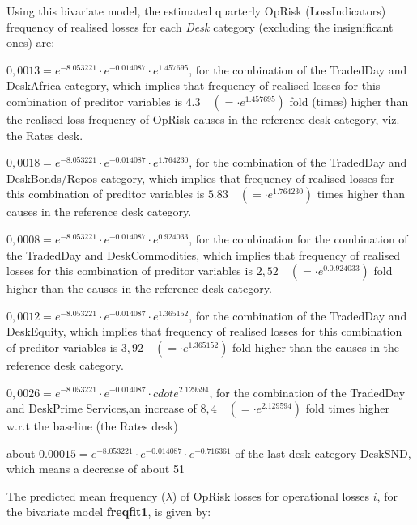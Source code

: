 \documentclass{DissertateUSU}
\begin{document}
\doublespacing

Using this bivariate model, the estimated quarterly OpRisk
(LossIndicators) frequency of realised losses for each \emph{Desk}
category (excluding the insignificant ones) are:

\begin{list}{*}{}
\item $0,0013 = e^{-8.053221}\cdot e^{-0.014087}\cdot e^{1.457695}$, for the combination of the TradedDay and DeskAfrica category, which implies that frequency of realised losses for this combination of preditor variables is $4.3 \quad (=\cdot e^{1.457695})$ fold (times) higher than the realised loss frequency of OpRisk causes in the reference desk category, viz. the Rates desk. 
\item $0,0018 = e^{-8.053221}\cdot e^{-0.014087}\cdot e^{1.764230}$, for the combination of the TradedDay and DeskBonds/Repos category, which implies that frequency of realised losses for this combination of preditor variables is $5.83 \quad (=\cdot e^{1.764230})$ times higher than causes in the reference desk category.
\item $0,0008 = e^{-8.053221}\cdot e^{-0.014087}\cdot  e^{0.924033}$, for the combination  for the combination of the TradedDay and DeskCommodities, which implies that frequency of realised losses for this combination of preditor variables is $2,52 \quad (=\cdot e^{0.0.924033})$ fold higher than the causes in the reference desk category.
\item $0,0012 = e^{-8.053221}\cdot e^{-0.014087}\cdot  e^{1.365152}$, for the combination of the TradedDay and DeskEquity, which implies that frequency of realised losses for this combination of preditor variables is $3,92 \quad (=\cdot e^{1.365152})$ fold higher than the causes in the reference desk category.
\item $0,0026 = e^{-8.053221}\cdot e^{-0.014087}\cdot cdot e^{2.129594}$, for the combination of the TradedDay and DeskPrime Services,an increase of $8,4 \quad (=\cdot e^{2.129594})$ fold times higher w.r.t the baseline (the Rates desk)
\item about $0.00015 = e^{-8.053221}\cdot e^{-0.014087}\cdot  e^{-0.716361}$ of the last desk category DeskSND, which means a decrease of about 51%
\end{list}

The predicted mean frequency (\(\lambda\)) of OpRisk losses for
operational losses \(i\), for the bivariate model \textbf{freqfit1}, is
given by:
\end{document}
